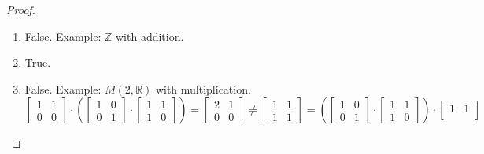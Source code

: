 \begin{proof}
    \begin{enumerate}[label={\textbf{\alph*.}},itemsep=0pt,topsep=0pt]
        \item False. Example: $\mathbb{Z}$ with addition.
        \item True.
        \item False. Example: $M(2,\mathbb{R})$ with multiplication.
              \[
                  \begin{bmatrix}
                      1 & 1 \\
                      0 & 0
                  \end{bmatrix}
                  \cdot
                  \left(
                  \begin{bmatrix}
                          1 & 0 \\
                          0 & 1
                      \end{bmatrix}
                  \cdot
                  \begin{bmatrix}
                          1 & 1 \\
                          1 & 0
                      \end{bmatrix}
                  \right)
                  =
                  \begin{bmatrix}
                      2 & 1 \\
                      0 & 0
                  \end{bmatrix}
                  \ne
                  \begin{bmatrix}
                      1 & 1 \\
                      1 & 1
                  \end{bmatrix}
                  =
                  \left(
                  \begin{bmatrix}
                          1 & 0 \\
                          0 & 1
                      \end{bmatrix}
                  \cdot
                  \begin{bmatrix}
                          1 & 1 \\
                          1 & 0
                      \end{bmatrix}
                  \right)
                  \cdot
                  \begin{bmatrix}
                      1 & 1 \\

\end{bmatrix}\]
\end{enumerate}
\end{proof}
